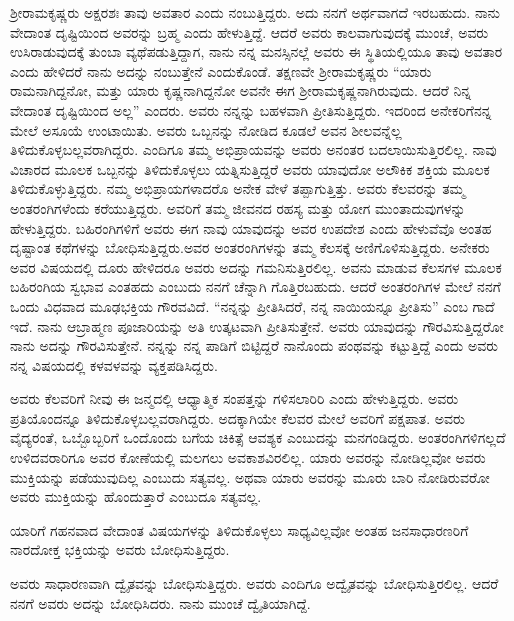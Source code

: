 ಶ‍್ರೀರಾಮಕೃಷ್ಣರು ಅಕ್ಷರಶಃ ತಾವು ಅವತಾರ ಎಂದು ನಂಬುತ್ತಿದ್ದರು. ಅದು ನನಗೆ ಅರ್ಥವಾಗದೆ ಇರಬಹುದು. ನಾನು ವೇದಾಂತ ದೃಷ್ಟಿಯಿಂದ ಅವರನ್ನು ಬ್ರಹ್ಮ ಎಂದು ಹೇಳುತ್ತಿದ್ದೆ. ಆದರೆ ಅವರು ಕಾಲವಾಗುವುದಕ್ಕೆ ಮುಂಚೆ, ಅವರು ಉಸಿರಾಡುವುದಕ್ಕೆ ತುಂಬಾ ವ್ಯಥೆಪಡುತ್ತಿದ್ದಾಗ, ನಾನು ನನ್ನ ಮನಸ್ಸಿನಲ್ಲೆ ಅವರು ಈ ಸ್ಥಿತಿಯಲ್ಲಿಯೂ ತಾವು ಅವತಾರ ಎಂದು ಹೇಳಿದರೆ ನಾನು ಅದನ್ನು ನಂಬುತ್ತೇನೆ ಎಂದುಕೊಂಡೆ. ತಕ್ಷಣವೇ ಶ‍್ರೀರಾಮಕೃಷ್ಣರು “ಯಾರು ರಾಮನಾಗಿದ್ದನೋ, ಮತ್ತು ಯಾರು ಕೃಷ್ಣನಾಗಿದ್ದನೋ ಅವನೇ ಈಗ ಶ‍್ರೀರಾಮಕೃಷ್ಣನಾಗಿರುವುದು. ಆದರೆ ನಿನ್ನ ವೇದಾಂತ ದೃಷ್ಟಿಯಿಂದ ಅಲ್ಲ” ಎಂದರು. ಅವರು ನನ್ನನ್ನು ಬಹಳವಾಗಿ ಪ್ರೀತಿಸುತ್ತಿದ್ದರು. ಇದರಿಂದ ಅನೇಕರಿಗೆ\break ನನ್ನ ಮೇಲೆ ಅಸೂಯೆ ಉಂಟಾಯಿತು. ಅವರು ಒಬ್ಬನನ್ನು ನೋಡಿದ ಕೂಡಲೆ ಅವನ ಶೀಲವನ್ನೆಲ್ಲ ತಿಳಿದುಕೊಳ್ಳಬಲ್ಲವರಾಗಿದ್ದರು. ಎಂದಿಗೂ ತಮ್ಮ ಅಭಿಪ್ರಾಯವನ್ನು ಅವರು ಅನಂತರ ಬದಲಾಯಿಸುತ್ತಿರಲಿಲ್ಲ. ನಾವು ವಿಚಾರದ ಮೂಲಕ ಒಬ್ಬನನ್ನು ತಿಳಿದುಕೊಳ್ಳಲು ಯತ್ನಿಸುತ್ತಿದ್ದರೆ ಅವರು ಯಾವುದೋ ಅಲೌಕಿಕ ಶಕ್ತಿಯ ಮೂಲಕ ತಿಳಿದುಕೊಳ್ಳುತ್ತಿದ್ದರು. ನಮ್ಮ ಅಭಿಪ್ರಾಯಗಳಾದರೊ ಅನೇಕ ವೇಳೆ ತಪ್ಪಾಗುತ್ತಿತ್ತು. ಅವರು ಕೆಲವರನ್ನು ತಮ್ಮ ಅಂತರಂಗಿಗಳೆಂದು ಕರೆಯುತ್ತಿದ್ದರು. ಅವರಿಗೆ ತಮ್ಮ ಜೀವನದ ರಹಸ್ಯ ಮತ್ತು ಯೋಗ ಮುಂತಾದುವುಗಳನ್ನು ಹೇಳುತ್ತಿದ್ದರು. ಬಹಿರಂಗಿಗಳಿಗೆ ಅವರು ಈಗ ನಾವು ಯಾವುದನ್ನು ಅವರ ಉಪದೇಶ ಎಂದು ಹೇಳುವೆವೊ ಅಂತಹ ದೃಷ್ಟಾಂತ ಕಥೆಗಳನ್ನು ಬೋಧಿಸುತ್ತಿದ್ದರು.\break ಅವರ ಅಂತರಂಗಿಗಳನ್ನು ತಮ್ಮ ಕೆಲಸಕ್ಕೆ ಅಣಿಗೊಳಿಸುತ್ತಿದ್ದರು. ಅನೇಕರು ಅವರ ವಿಷಯದಲ್ಲಿ ದೂರು ಹೇಳಿದರೂ ಅವರು ಅದನ್ನು ಗಮನಿಸುತ್ತಿರಲಿಲ್ಲ. ಅವನು ಮಾಡುವ ಕೆಲಸಗಳ ಮೂಲಕ ಬಹಿರಂಗಿಯ ಸ್ವಭಾವ ಎಂತಹದು ಎಂಬುದು ನನಗೆ ಚೆನ್ನಾಗಿ ಗೊತ್ತಿರಬಹುದು. ಆದರೆ ಅಂತರಂಗಿಗಳ ಮೇಲೆ ನನಗೆ ಒಂದು ವಿಧವಾದ ಮೂಢಭಕ್ತಿಯ ಗೌರವವಿದೆ. “ನನ್ನನ್ನು ಪ್ರೀತಿಸಿದರೆ, ನನ್ನ ನಾಯಿಯನ್ನೂ ಪ್ರೀತಿಸು” ಎಂಬ ಗಾದೆ ಇದೆ. ನಾನು ಆ\break ಬ್ರಾಹ್ಮಣ ಪೂಜಾರಿಯನ್ನು ಅತಿ ಉತ್ಕಟವಾಗಿ ಪ್ರೀತಿಸುತ್ತೇನೆ. ಅವರು ಯಾವುದನ್ನು ಗೌರವಿಸುತ್ತಿದ್ದರೋ ನಾನು ಅದನ್ನು ಗೌರವಿಸುತ್ತೇನೆ. ನನ್ನನ್ನು ನನ್ನ ಪಾಡಿಗೆ ಬಿಟ್ಟಿದ್ದರೆ ನಾನೊಂದು ಪಂಥವನ್ನು ಕಟ್ಟುತ್ತಿದ್ದೆ ಎಂದು ಅವರು ನನ್ನ ವಿಷಯದಲ್ಲಿ ಕಳವಳವನ್ನು ವ್ಯಕ್ತಪಡಿಸಿದ್ದರು.

\vskip 5pt

ಅವರು ಕೆಲವರಿಗೆ ನೀವು ಈ ಜನ್ಮದಲ್ಲಿ ಆಧ್ಯಾತ್ಮಿಕ ಸಂಪತ್ತನ್ನು ಗಳಿಸಲಾರಿರಿ ಎಂದು ಹೇಳುತ್ತಿದ್ದರು. ಅವರು ಪ್ರತಿಯೊಂದನ್ನೂ ತಿಳಿದುಕೊಳ್ಳಬಲ್ಲವರಾಗಿದ್ದರು. ಅದಕ್ಕಾಗಿಯೇ ಕೆಲವರ ಮೇಲೆ ಅವರಿಗೆ ಪಕ್ಷಪಾತ. ಅವರು ವೈದ್ಯರಂತೆ, ಒಬ್ಬೊಬ್ಬರಿಗೆ ಒಂದೊಂದು ಬಗೆಯ ಚಿಕಿತ್ಸೆ ಆವಶ್ಯಕ ಎಂಬುದನ್ನು ಮನಗಂಡಿದ್ದರು. ಅಂತರಂಗಿಗಳಿಗಲ್ಲದೆ ಉಳಿದವರಾರಿಗೂ ಅವರ ಕೋಣೆಯಲ್ಲಿ ಮಲಗಲು ಅವಕಾಶವಿರಲಿಲ್ಲ. ಯಾರು ಅವರನ್ನು ನೋಡಿಲ್ಲವೋ ಅವರು ಮುಕ್ತಿಯನ್ನು ಪಡೆಯುವುದಿಲ್ಲ ಎಂಬುದು ಸತ್ಯವಲ್ಲ. ಅಥವಾ ಯಾರು ಅವರನ್ನು ಮೂರು ಬಾರಿ ನೋಡಿರುವರೋ ಅವರು ಮುಕ್ತಿಯನ್ನು ಹೊಂದುತ್ತಾರೆ ಎಂಬುದೂ ಸತ್ಯವಲ್ಲ.

\vskip 5pt

ಯಾರಿಗೆ ಗಹನವಾದ ವೇದಾಂತ ವಿಷಯಗಳನ್ನು ತಿಳಿದುಕೊಳ್ಳಲು ಸಾಧ್ಯವಿಲ್ಲವೋ ಅಂತಹ ಜನಸಾಧಾರಣರಿಗೆ ನಾರದೋಕ್ತ ಭಕ್ತಿಯನ್ನು ಅವರು ಬೋಧಿಸುತ್ತಿದ್ದರು.

\vskip 5pt

ಅವರು ಸಾಧಾರಣವಾಗಿ ದ್ವೈತವನ್ನು ಬೋಧಿಸುತ್ತಿದ್ದರು. ಅವರು ಎಂದಿಗೂ ಅದ್ವೈತವನ್ನು ಬೋಧಿಸುತ್ತಿರಲಿಲ್ಲ. ಆದರೆ ನನಗೆ ಅವರು ಅದನ್ನು ಬೋಧಿಸಿದರು. ನಾನು ಮುಂಚೆ ದ್ವೈತಿಯಾಗಿದ್ದೆ.

